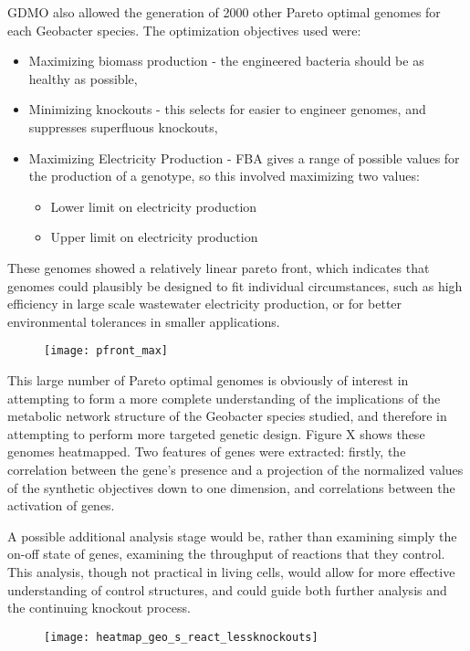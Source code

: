 \documentclass[a4paper]{article}
\begin{document}
GDMO also allowed the generation of 2000 other Pareto optimal genomes for each Geobacter species. The optimization objectives used were:
\begin{itemize}
	\item Maximizing biomass production - the engineered bacteria should be as healthy as possible,
	\item Minimizing knockouts - this selects for easier to engineer genomes, and suppresses superfluous knockouts,
	\item Maximizing Electricity Production - FBA gives a range of possible values for the production of a genotype, so this involved maximizing two values:
	\begin{itemize}
		\item Lower limit on electricity production
		\item Upper limit on electricity production
	\end{itemize}
\end{itemize}
These genomes showed a relatively linear pareto front, which indicates that genomes could plausibly be designed to fit individual circumstances, such as high efficiency in large scale wastewater electricity production, or for better environmental tolerances in smaller applications.

\begin{figure}
\texttt{[image: pfront\_max]}
\end{figure}


This large number of Pareto optimal genomes is obviously of interest in attempting to form a more complete understanding of the implications of the metabolic network structure of the Geobacter species studied, and therefore in attempting to perform more targeted genetic design. Figure X shows these genomes heatmapped. Two features of genes were extracted: firstly, the correlation between the gene’s presence and a projection of the normalized values of the synthetic objectives down to one dimension, and correlations between the activation of genes. 

A possible additional analysis stage would be, rather than examining simply the on-off state of genes, examining the throughput of reactions that they control. This analysis, though not practical in living cells, would allow for more effective understanding of control structures, and could guide both further analysis and the continuing knockout process.

\begin{figure}
\texttt{[image: heatmap\_geo\_s\_react\_lessknockouts]}
\end{figure}
\end{document}
